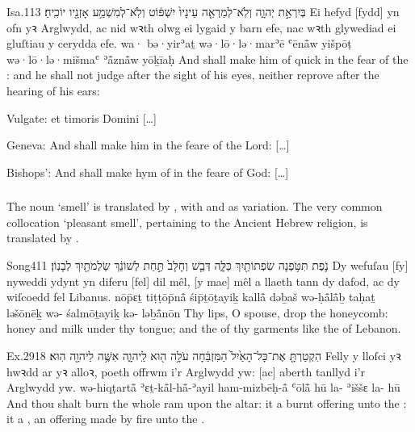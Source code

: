 \begin{example}{Isa.}{11}{3}{}{}
	\quoling
	{ בְּיִרְאַ֣ת יְהוָ֑ה וְלֹֽא־לְמַרְאֵ֤ה עֵינָיו֙ יִשְׁפּ֔וֹט וְלֹֽא־לְמִשְׁמַ֥ע אָזְנָ֖יו יוֹכִֽיחַ׃}
	{Ei  hefyd [fydd] yn ofn yꝛ Arglwydd, ac nid wꝛth olwg ei lygaid y barn efe, nac wꝛth glywediad ei gluſtiau y cerydda efe.}
	{wa· bə·yirʾaṯ {\YHWH} wə·lō·lə·marʾē ʿēnå̄w yišpōṭ wə·lō·lə·mišmaʿ ʾå̄znå̄w yōḵīaḥ}
	{And shall make him of quick  in the fear of the {\LORD}: and he shall not judge after the sight of his eyes, neither reprove after the hearing of his ears:}
\end{example}
\begin{compactdesc}\small
	\item [Vulgate:] et  timoris Domini […]
	\item [Geneva:] And shall make him  in the feare of the Lord: […]
	\item [Bishops’:] And shall make hym of  in the feare of God: […]
\end{compactdesc}



\subsubsection{}

\begin{paper}
	The noun  ‘smell’ is translated by , with  and  as variation. The very common collocation  ‘pleasant smell’, pertaining to the Ancient Hebrew religion, is translated by .
\end{paper}

\begin{example}{Song}{4}{11}{}{}
	\quoling
	{נֹ֛פֶת תִּטֹּ֥פְנָה שִׂפְתוֹתַ֖יִךְ כַּלָּ֑ה דְּבַ֤שׁ וְחָלָב֙ תַּ֣חַת לְשׁוֹנֵ֔ךְ  שַׂלְמֹתַ֖יִךְ  לְבָנֽוֹן׃}
	{Dy wefuſau [fy] nyweddi ydynt yn diferu [fel] dil mêl, [y mae] mêl a llaeth tann dy dafod, ac  dy wiſcoedd fel  Libanus.}
	{nōp̄ɛṯ tiṭṭōp̄nå̄ śip̄ṯōṯayiḵ kallå̄ dəḇaš wə-ḥå̄lå̄ḇ taḥaṯ ləšōnēḵ wə- śalmōṯayiḵ kə- ləḇå̄nōn}
	{Thy lips, O  spouse, drop  the honeycomb: honey and milk  under thy tongue; and the  of thy garments  like the  of Lebanon.}
\end{example}

\begin{example}{Ex.}{29}{18}{}{}
	\quoling
	{הִקְטַרְתָּ֤ אֶת־כָּל־הָאַ֙יִל֙ הַמִּזְבֵּ֔חָה עֹלָ֥ה ה֖וּא לַֽיהוָ֑ה  אִשֶּׁ֥ה לַיהוָ֖ה הֽוּא׃}
	{Felly y lloſci yꝛ hwꝛdd ar yꝛ alloꝛ, poeth offrwm i’r Arglwydd yw:  [ac] aberth tanllyd i’r Arglwydd yw.}
	{wə-hiqṭartå̄ ʾɛṯ-kå̄l-hå̄-ʾayil ham-mizbēḥ-å̄ ʿōlå̄ hū la-{\YHWH}  ʾiššɛ la-{\YHWH} hū}
	{And thou shalt burn the whole ram upon the altar: it  a burnt offering unto the {\LORD}: it  a , an offering made by fire unto the {\LORD}.}
\end{example}
